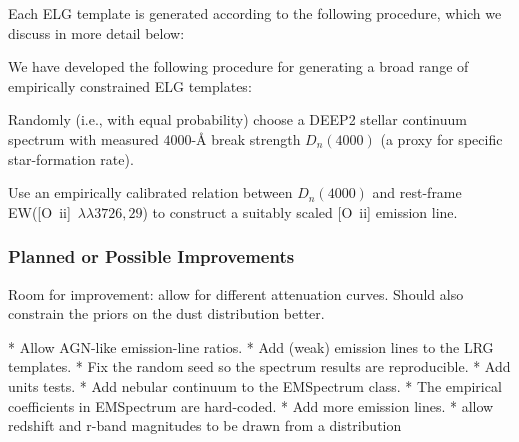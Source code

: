 \documentclass[12pt]{article}
\newcommand{\oii}{[O~{\sc ii}]}
\newcommand{\ewoiilam}{EW([O~{\sc ii}]~\ensuremath{\lambda\lambda3726,29})}
\begin{document}


Each ELG template is generated according to the following procedure, which we
discuss in more detail below:

We have developed the following procedure for generating a broad range of
empirically constrained ELG templates:
\begin{enumerate*}
\item{Randomly (i.e., with equal probability) choose a DEEP2 stellar continuum
  spectrum with measured $4000$-\AA{} break strength $D_{n}(4000)$ (a proxy for
  specific star-formation rate).}
\item{Use an empirically calibrated relation between $D_{n}(4000)$ and
  rest-frame \ewoiilam{} to construct a suitably scaled \oii{} emission line.}
\item{}
\end{enumerate*}

\subsubsection{Planned or Possible Improvements}

Room for improvement: allow for different attenuation curves.  Should also
constrain the priors on the dust distribution better.

* Allow AGN-like emission-line ratios.
* Add (weak) emission lines to the LRG templates.
* Fix the random seed so the spectrum results are reproducible.
* Add units tests.
* Add nebular continuum to the EMSpectrum class.
* The empirical coefficients in EMSpectrum are hard-coded.
* Add more emission lines.
* allow redshift and r-band magnitudes to be drawn from a distribution
\end{document}
